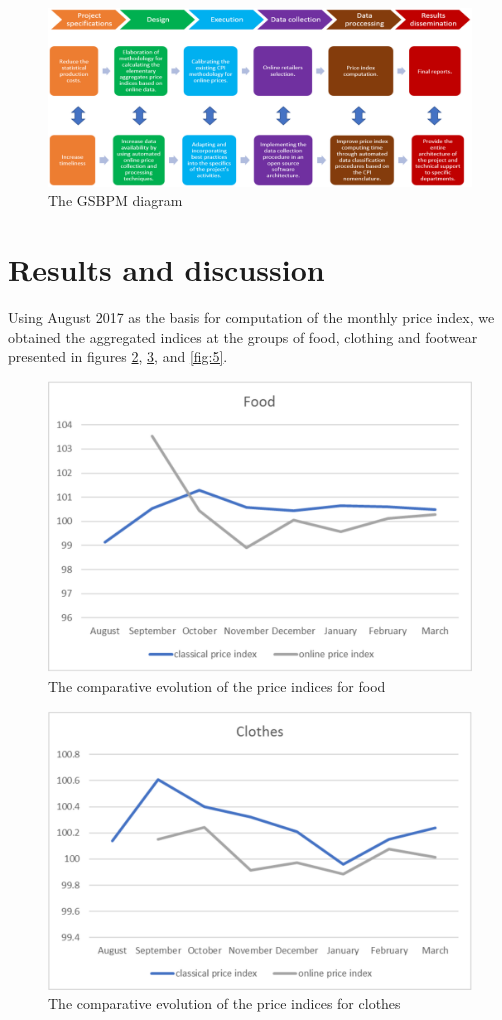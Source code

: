 \documentclass[]{article}
\begin{document}
\begin{figure}
	\centering
	\includegraphics[width=0.7\linewidth]{fig2.eps}
	\caption{The GSBPM diagram}
	\label{fig:2}
\end{figure}



\section{Results and discussion }

Using August 2017 as the basis for computation of the monthly price index, we obtained the aggregated indices at the 
groups of food, clothing and footwear presented in figures \ref{fig:3}, \ref{fig:4}, and \ref{fig:5}.


\begin{figure}
	\centering
	\includegraphics[width=0.7\linewidth]{fig3.eps}
	\caption{The comparative evolution of the price indices for food}
	\label{fig:3}
\end{figure}


\begin{figure}
	\centering
	\includegraphics[width=0.7\linewidth]{fig4.eps}
	\caption{The comparative evolution of the price indices for clothes}
	\label{fig:4}
\end{figure}
\end{document}
